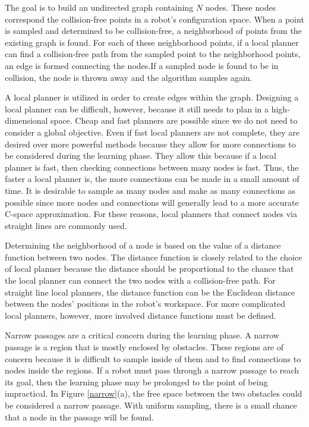 \documentclass[10pt,conference]{ieeeconf}
\begin{document}
The goal is to build an undirected graph containing $N$ nodes. These nodes correspond the collision-free points in a robot's configuration space. When a point is sampled and determined to be collision-free, a neighborhood of points from the existing graph is found. For each of these neighborhood points, if a local planner can find a collision-free path from the sampled point to the neighborhood points, an edge is formed connecting the nodes.If a sampled node is found to be in collision, the node is thrown away and the algorithm samples again. 

A local planner is utilized in order to create edges within the graph. Designing a local planner can be difficult, however, because it still needs to plan in a high-dimensional space. Cheap and fast planners are possible since we do not need to consider a global objective. Even if fast local planners are not complete, they are desired over more powerful methods because they allow for more connections to be considered during the learning phase. They allow this because if a local planner is fast, then checking connections between many nodes is fast. Thus, the faster a local planner is, the more connections can be made in a small amount of time. It is desirable to sample as many nodes and make as many connections as possible since more nodes and connections will generally lead to a more accurate C-space approximation. For these reasons, local planners that connect nodes via straight lines are commonly used.

Determining the neighborhood of a node is based on the value of a distance function between two nodes. The distance function is closely related to the choice of local planner because the distance should be proportional to the chance that the local planner can connect the two nodes with a collision-free path. For straight line local planners, the distance function can be the Euclidean distance between the nodes' positions in the robot's workspace. For more complicated local planners, however, more involved distance functions must be defined.  

Narrow passages are a critical concern during the learning phase. A narrow passage is a region that is mostly enclosed by obstacles. These regions are of concern because it is difficult to sample inside of them and to find connections to nodes inside the regions. If a robot must pass through a narrow passage to reach its goal, then the learning phase may be prolonged to the point of being impractical. In Figure \ref{narrow}(a), the free space between the two obstacles could be considered a narrow passage. With uniform sampling, there is a small chance that a node in the passage will be found.  
\end{document}
